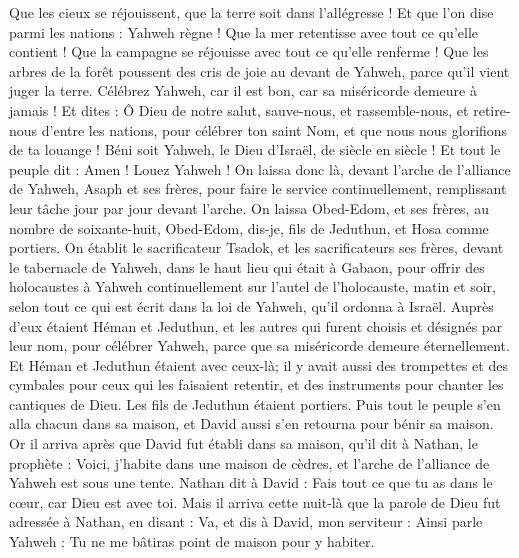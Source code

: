 \begin{multicols}{2}
Que les cieux se réjouissent, que la terre soit dans l’allégresse ! Et que l’on dise parmi les nations : Yahweh règne !
Que la mer retentisse avec tout ce qu'elle contient ! Que la campagne se réjouisse avec tout ce qu’elle renferme !
Que les arbres de la forêt poussent des cris de joie au devant de Yahweh, parce qu'il vient juger la terre.
Célébrez Yahweh, car il est bon, car sa miséricorde demeure à jamais !
Et dites : Ô Dieu de notre salut, sauve-nous, et rassemble-nous, et retire-nous d'entre les nations, pour célébrer ton saint Nom, et que nous nous glorifions de ta louange !
Béni soit Yahweh, le Dieu d'Israël, de siècle en siècle ! Et tout le peuple dit : Amen ! Louez Yahweh !
On laissa donc là, devant l’arche de l'alliance de Yahweh, Asaph et ses frères, pour faire le service continuellement, remplissant leur tâche jour par jour devant l’arche.
On laissa Obed-Edom, et ses frères, au nombre de soixante-huit, Obed-Edom, dis-je, fils de Jeduthun, et Hosa comme portiers.
On établit le sacrificateur Tsadok, et les sacrificateurs ses frères, devant le tabernacle de Yahweh, dans le haut lieu qui était à Gabaon,
pour offrir des holocaustes à Yahweh continuellement sur l'autel de l'holocauste, matin et soir, selon tout ce qui est écrit dans la loi de Yahweh, qu’il ordonna à Israël.
Auprès d’eux étaient Héman et Jeduthun, et les autres qui furent choisis et désignés par leur nom, pour célébrer Yahweh, parce que sa miséricorde demeure éternellement.
Et Héman et Jeduthun étaient avec ceux-là; il y avait aussi des trompettes et des cymbales pour ceux qui les faisaient retentir, et des instruments pour chanter les cantiques de Dieu. Les fils de Jeduthun étaient portiers.
Puis tout le peuple s'en alla chacun dans sa maison, et David aussi s'en retourna pour bénir sa maison.
\VerseOne{}Or il arriva après que David fut établi dans sa maison, qu'il dit à Nathan, le prophète : Voici,  j’habite dans une maison de cèdres, et l’arche de l'alliance de Yahweh est sous une tente.
Nathan dit à David : Fais tout ce que tu as dans le cœur, car Dieu est avec toi.
Mais il arriva cette nuit-là que la parole de Dieu fut adressée à Nathan, en disant :
Va, et dis à David, mon serviteur : Ainsi parle Yahweh :  Tu ne me bâtiras point de maison pour y habiter.

\end{multicols}
